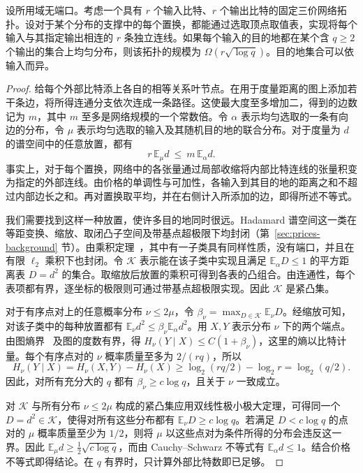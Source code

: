 \begin{lemma}[均匀分布的目的地]\label{lem:uniform-demand}
设所用域无端口。考虑一个具有 \(r\) 个输入比特、\(r\) 个输出比特的固定三价网络拓扑。设对于某个分布的支撑中的每个置换，都能通过选取顶点取值表，实现将每个输入与其指定输出相连的 \(r\) 条独立连线。如果每个输入的目的地都在某个含 \(q\ge2\) 个输出的集合上均匀分布，则该拓扑的规模为 \(\Omega(r\sqrt{\log q})\)。目的地集合可以依输入而异。
\end{lemma}

\begin{proof}
给每个外部比特添上各自的相等关系叶节点。在用于度量距离的图上添加若干条边，将所得连通分支依次连成一条路径。这使最大度至多增加二，得到的边数记为 \(m\)，其中 \(m\) 至多是网络规模的一个常数倍。令 \(\alpha\) 表示均匀选取的一条有向边的分布，令 \(\mu\) 表示均匀选取的输入及其随机目的地的联合分布。对于度量为 \(d\) 的谱空间中的任意放置，都有
\[
                    r\,\mathbb E_\mu d\ \le\ m\,\mathbb E_\alpha d .
\]
事实上，对于每个置换，网络中的各张量通过局部收缩将内部比特连线的张量积变为指定的外部连线。由价格的单调性与可加性，各输入到其目的地的距离之和不超过内部边长之和。再对置换取平均，并在右侧计入所添加的边，即得所述不等式。

我们需要找到这样一种放置，使许多目的地同时很远。Hadamard 谱空间这一类在等距变换、缩放、取闭凸子空间及带基点超极限下均封闭（第~\ref{sec:prices-background} 节）。由乘积定理~\cite[定理~]{oaP}，其中有一子类具有同样性质，没有端口，并且在有限 \(\ell_2\) 乘积下也封闭。令 \(\mathcal K\) 表示能在该子类中实现且满足 \(\mathbb E_\alpha D\le1\) 的平方距离表 \(D=d^2\) 的集合。取缩放后放置的乘积可得到各表的凸组合。由连通性，每个表项都有界，逐坐标的极限则可通过带基点超极限实现。因此 \(\mathcal K\) 是紧凸集。

对于有序点对上的任意概率分布 \(\nu\le 2\mu\)，令 \(\beta_\nu=\max_{D\in\mathcal K}\mathbb E_\nu D\)。经缩放可知，对该子类中的每种放置都有 \(\mathbb E_\nu d^2\le\beta_\nu\mathbb E_\alpha d^2\)。用 \(X,Y\) 表示分布 \(\nu\) 下的两个端点。由图熵界~\cite[推论~]{oaP} 及图的度数有界，得 \(H_\nu(Y\mid X)\le C(1+\beta_\nu)\)，这里的熵以比特计量。每个有序点对的 \(\nu\) 概率质量至多为 \(2/(rq)\)，所以
\[
    H_\nu(Y\mid X)=H_\nu(X,Y)-H_\nu(X)
               \ge \log_2(rq/2)-\log_2 r=\log_2(q/2).
\]
因此，对所有充分大的 \(q\) 都有 \(\beta_\nu\ge c\log q\)，且关于 \(\nu\) 一致成立。

对 \(\mathcal K\) 与所有分布 \(\nu\le2\mu\) 构成的紧凸集应用双线性极小极大定理，可得同一个 \(D=d^2\in\mathcal K\)，使得对所有这些分布都有 \(\mathbb E_\nu D\ge c\log q\)。若满足 \(D<c\log q\) 的点对的 \(\mu\) 概率质量至少为 \(1/2\)，则将 \(\mu\) 以这些点对为条件所得的分布会违反这一界。因此 \(\mathbb E_\mu d\ge \tfrac12\sqrt{c\log q}\)，而由 Cauchy--Schwarz 不等式有 \(\mathbb E_\alpha d\le1\)。结合价格不等式即得结论。在 \(q\) 有界时，只计算外部比特数即已足够。
\end{proof}

